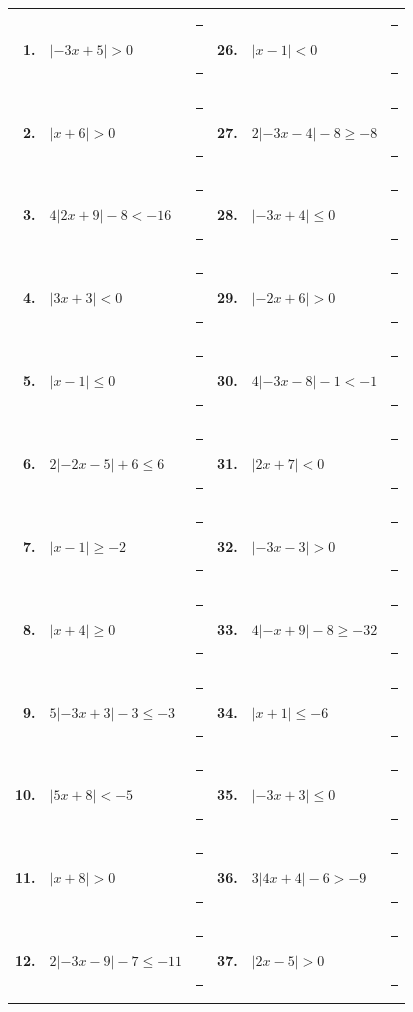 \documentclass[10pt]{article}
\begin{document}
{\small\begin{tabular}{@{}r@{\ \ }p{4.1cm}p{4.0cm}@{\qquad}r@{\ \ }p{4.1cm}p{4.0cm}@{}}
\textbf{1.} & $\left|-3x+5\right|>0$ & \rule{0.6cm}{0.4pt}\ \rule{2.8cm}{0.4pt} & \textbf{26.} & $\left|x-1\right|<0$ & \rule{0.6cm}{0.4pt}\ \rule{2.8cm}{0.4pt}\\
\textbf{2.} & $\left|x+6\right|>0$ & \rule{0.6cm}{0.4pt}\ \rule{2.8cm}{0.4pt} & \textbf{27.} & $2\left|-3x-4\right|-8\ge-8$ & \rule{0.6cm}{0.4pt}\ \rule{2.8cm}{0.4pt}\\
\textbf{3.} & $4\left|2x+9\right|-8<-16$ & \rule{0.6cm}{0.4pt}\ \rule{2.8cm}{0.4pt} & \textbf{28.} & $\left|-3x+4\right|\le0$ & \rule{0.6cm}{0.4pt}\ \rule{2.8cm}{0.4pt}\\
\textbf{4.} & $\left|3x+3\right|<0$ & \rule{0.6cm}{0.4pt}\ \rule{2.8cm}{0.4pt} & \textbf{29.} & $\left|-2x+6\right|>0$ & \rule{0.6cm}{0.4pt}\ \rule{2.8cm}{0.4pt}\\
\textbf{5.} & $\left|x-1\right|\le0$ & \rule{0.6cm}{0.4pt}\ \rule{2.8cm}{0.4pt} & \textbf{30.} & $4\left|-3x-8\right|-1<-1$ & \rule{0.6cm}{0.4pt}\ \rule{2.8cm}{0.4pt}\\
\textbf{6.} & $2\left|-2x-5\right|+6\le6$ & \rule{0.6cm}{0.4pt}\ \rule{2.8cm}{0.4pt} & \textbf{31.} & $\left|2x+7\right|<0$ & \rule{0.6cm}{0.4pt}\ \rule{2.8cm}{0.4pt}\\
\textbf{7.} & $\left|x-1\right|\ge-2$ & \rule{0.6cm}{0.4pt}\ \rule{2.8cm}{0.4pt} & \textbf{32.} & $\left|-3x-3\right|>0$ & \rule{0.6cm}{0.4pt}\ \rule{2.8cm}{0.4pt}\\
\textbf{8.} & $\left|x+4\right|\ge0$ & \rule{0.6cm}{0.4pt}\ \rule{2.8cm}{0.4pt} & \textbf{33.} & $4\left|-x+9\right|-8\ge-32$ & \rule{0.6cm}{0.4pt}\ \rule{2.8cm}{0.4pt}\\
\textbf{9.} & $5\left|-3x+3\right|-3\le-3$ & \rule{0.6cm}{0.4pt}\ \rule{2.8cm}{0.4pt} & \textbf{34.} & $\left|x+1\right|\le-6$ & \rule{0.6cm}{0.4pt}\ \rule{2.8cm}{0.4pt}\\
\textbf{10.} & $\left|5x+8\right|<-5$ & \rule{0.6cm}{0.4pt}\ \rule{2.8cm}{0.4pt} & \textbf{35.} & $\left|-3x+3\right|\le0$ & \rule{0.6cm}{0.4pt}\ \rule{2.8cm}{0.4pt}\\
\textbf{11.} & $\left|x+8\right|>0$ & \rule{0.6cm}{0.4pt}\ \rule{2.8cm}{0.4pt} & \textbf{36.} & $3\left|4x+4\right|-6>-9$ & \rule{0.6cm}{0.4pt}\ \rule{2.8cm}{0.4pt}\\
\textbf{12.} & $2\left|-3x-9\right|-7\le-11$ & \rule{0.6cm}{0.4pt}\ \rule{2.8cm}{0.4pt} & \textbf{37.} & $\left|2x-5\right|>0$ & \rule{0.6cm}{0.4pt}\ \rule{2.8cm}{0.4pt}\\

\end{tabular}}
\end{document}
